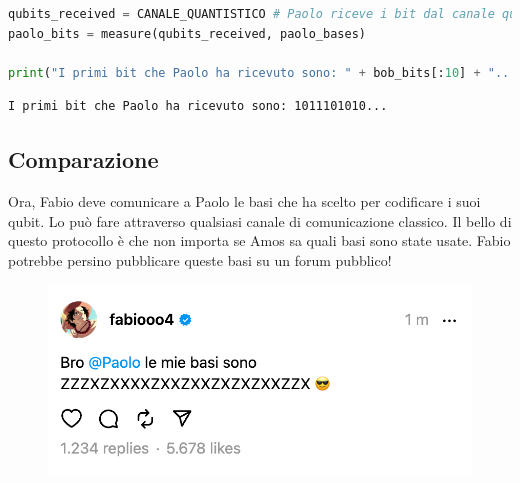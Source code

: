 \documentclass[a4paper]{article}
\begin{document}
\begin{lstlisting}[language=Python]
qubits_received = CANALE_QUANTISTICO # Paolo riceve i bit dal canale quantistico
paolo_bits = measure(qubits_received, paolo_bases)

print("I primi bit che Paolo ha ricevuto sono: " + bob_bits[:10] + "...")  
\end{lstlisting}
\begin{lstlisting}
I primi bit che Paolo ha ricevuto sono: 1011101010...
\end{lstlisting}

\subsection{Comparazione}

Ora, Fabio deve comunicare a Paolo le basi che ha scelto per codificare i suoi qubit. 
Lo può fare attraverso qualsiasi canale di comunicazione classico. Il bello di questo protocollo
è che non importa se Amos sa quali basi sono state usate. Fabio potrebbe persino pubblicare queste basi
su un forum pubblico!

\begin{figure}[H]
  \centering
  \includegraphics[width=1\textwidth]{post}
  \label{fig:post}
\end{figure}
\end{document}
